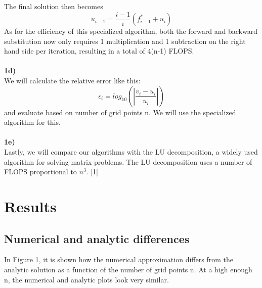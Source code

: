 \documentclass{article}
\begin{document}
The final solution then becomes
\begin{equation}
    u_{i-1} = \frac{i-1}{i}(f_{i-1}^* + u_i)
\end{equation}
As for the efficiency of this specialized algorithm, both the forward and backward substitution now only requires 1 multiplication and 1 subtraction on the right hand side per iteration, resulting in a total of 4(n-1) FLOPS.\\\\
\textbf{1d)}\\
We will calculate the relative error like this:
\begin{equation}
    \epsilon_i=log_{10}\left(\left|\frac{v_i-u_i}
                 {u_i}\right|\right)
\end{equation}
and evaluate based on number of grid points n. We will use the specialized algorithm for this.\\\\
\textbf{1e)}\\
Lastly, we will compare our algorithms with the LU decomposition, a widely used algorithm for solving matrix problems. The LU decomposition uses a number of FLOPS proportional to $n^3$. [1]
\section{Results}
\subsection{Numerical and analytic differences}
In Figure 1, it is shown how the numerical approximation differs from the analytic solution as a function of the number of grid points n. At a high enough n, the numerical and analytic plots look very similar.
\end{document}
